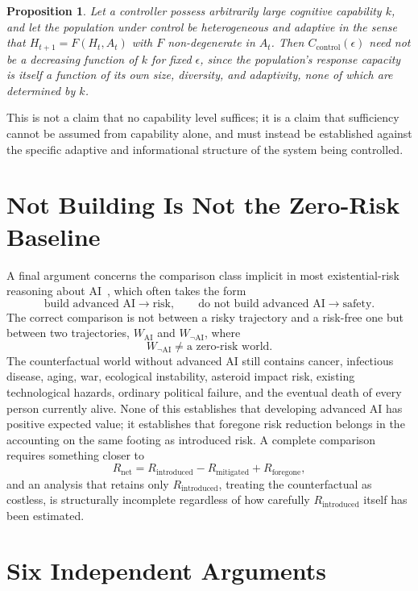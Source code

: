 \documentclass[11pt]{article}
\newtheorem{proposition}{Proposition}
\begin{document}
\begin{proposition}
Let a controller possess arbitrarily large cognitive capability $k$, and let the population under control be heterogeneous and adaptive in the sense that $H_{t+1} = F(H_t, A_t)$ with $F$ non-degenerate in $A_t$. Then $C_{\text{control}}(\epsilon)$ need not be a decreasing function of $k$ for fixed $\epsilon$, since the population's response capacity is itself a function of its own size, diversity, and adaptivity, none of which are determined by $k$.
\end{proposition}

This is not a claim that no capability level suffices; it is a claim that sufficiency cannot be assumed from capability alone, and must instead be established against the specific adaptive and informational structure of the system being controlled.

\section{Not Building Is Not the Zero-Risk Baseline}

A final argument concerns the comparison class implicit in most existential-risk reasoning about AI~\cite{bostrom2013,ord2020}, which often takes the form
\[
\text{build advanced AI} \rightarrow \text{risk}, \qquad \text{do not build advanced AI} \rightarrow \text{safety}.
\]
The correct comparison is not between a risky trajectory and a risk-free one but between two trajectories, $W_{\text{AI}}$ and $W_{\neg\text{AI}}$, where
\[
W_{\neg\text{AI}} \neq \text{a zero-risk world.}
\]
The counterfactual world without advanced AI still contains cancer, infectious disease, aging, war, ecological instability, asteroid impact risk, existing technological hazards, ordinary political failure, and the eventual death of every person currently alive. None of this establishes that developing advanced AI has positive expected value; it establishes that foregone risk reduction belongs in the accounting on the same footing as introduced risk. A complete comparison requires something closer to
\[
R_{\text{net}} = R_{\text{introduced}} - R_{\text{mitigated}} + R_{\text{foregone}},
\]
and an analysis that retains only $R_{\text{introduced}}$, treating the counterfactual as costless, is structurally incomplete regardless of how carefully $R_{\text{introduced}}$ itself has been estimated.

\section{Six Independent Arguments}
\end{document}
